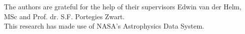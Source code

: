 \documentclass{aa}
\begin{document}
\begin{acknowledgements}
The authors are grateful for the help of their supervisors Edwin van der Helm, MSc and Prof. dr. S.F. Portegies Zwart. \\

This research has made use of NASA's Astrophysics Data System.
\end{acknowledgements}





\end{document}
